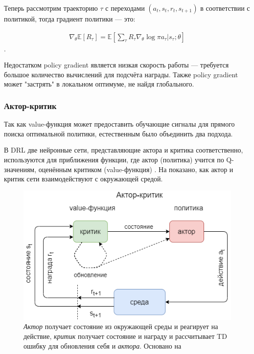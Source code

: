 Теперь рассмотрим траекторию $\tau$ с переходами $(a_t, s_t, r_t, s_{t+1})$ в соответствии с политикой, тогда градиент политики --- это:

\begin{equation}
\label{eq:ch1-likelihood-ratios}
\begin{multlined}
\nabla_\theta \mathbb{E}[R_\tau] = \mathbb{E}[\sum_\tau R_\tau \nabla_\theta \log \pi {a_\tau|s_\tau;\theta}]
\end{multlined}
\end{equation}.

Недостатком policy gradient является низкая скорость работы — требуется большое количество вычислений для подсчёта награды. Также policy gradient может "застрять" в локальном оптимуме, не найдя глобального. %

\subsubsection{Актор-критик}

Так как value-функция может предоставить обучающие сигналы для прямого поиска оптимальной политики, естественным было объединить два подхода.

В DRL две нейронные сети, представляющие актора и критика соответственно, используются для приближения функции, где актор (политика) учится по Q-значениям, оценённым критиком (value-функция) \cite{Arulkumaran_2017}. На  показано, как актор и критик сети взаимодействуют с окружающей средой.

\begin{figure}[ht!]
	\center
	\includegraphics [scale=0.60] {my_folder/images/ch1/RL-actor-critic.png}
	\caption{{\itshape Актор} получает состояние из окружающей среды и реагирует на действие, {\itshape критик} получает состояние и награду и рассчитывает TD ошибку для обновления себя и {\itshape актора}. Основано на \cite{Arulkumaran_2017}}
	\label{fig:ch1-RL-actor-critic}
\end{figure}

